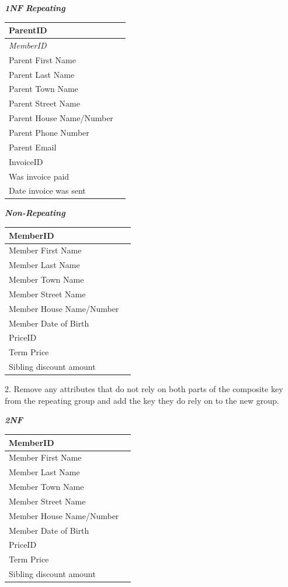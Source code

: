 \textbf{\textit{1NF}}
\textbf{\textit{Repeating}}
\begin{center}
	\begin{tabular}{|p{4cm}|p{4cm}|}
		\hline
		\textbf{ParentID} \\ \hline
		\textit{MemberID} \\ \hline
		Parent First Name \\ \hline
		Parent Last Name \\ \hline
		Parent Town Name \\ \hline
		Parent Street Name \\ \hline
		Parent House Name/Number \\ \hline
		Parent Phone Number \\ \hline
		Parent Email \\ \hline
		InvoiceID \\ \hline
		Was invoice paid \\ \hline
		Date invoice was sent \\ \hline
	\end{tabular}
\end{center}

\textbf{\textit{Non-Repeating}}
\begin{center}
	\begin{tabular}{|p{4cm}|p{4cm}|}
		\hline
		\textbf{MemberID} \\ \hline
		Member First Name  \\ \hline
		Member Last Name \\ \hline
		Member Town Name \\ \hline
		Member Street Name \\ \hline
		Member House Name/Number \\ \hline
		Member Date of Birth \\ \hline		
		PriceID \\ \hline
		Term Price \\ \hline
		Sibling discount amount \\ \hline
	\end{tabular}
\end{center}

2. Remove any attributes that do not rely on both parts of the composite key from the repeating group and add the key they do rely on to the new group.

\textbf{\textit{2NF}}
\begin{center}
	\begin{tabular}{|p{4cm}|p{4cm}|}
		\hline
		\textbf{MemberID} \\ \hline
		Member First Name  \\ \hline
		Member Last Name \\ \hline
		Member Town Name \\ \hline
		Member Street Name \\ \hline
		Member House Name/Number \\ \hline
		Member Date of Birth \\ \hline		
		PriceID \\ \hline
		Term Price \\ \hline
		Sibling discount amount \\ \hline
	\end{tabular}
\end{center}

